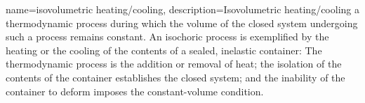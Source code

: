 {
    name=isovolumetric heating/cooling,
    description={Isovolumetric heating/cooling a thermodynamic process during which the volume of the closed system undergoing such a process remains constant. An isochoric process is exemplified by the heating or the cooling of the contents of a sealed, inelastic container: The thermodynamic process is the addition or removal of heat; the isolation of the contents of the container establishes the closed system; and the inability of the container to deform imposes the constant-volume condition.}
}
